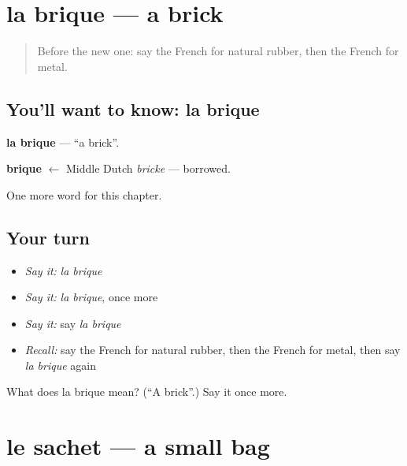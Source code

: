 \section[la brique]{la brique — a brick}

\label{lesson:FR-C202-brique}



\begin{quote}
Before the new one: say the French for natural rubber, then the French for metal.
\end{quote}

\subsection*{You'll want to know: la brique}
\textbf{la brique} — \textquotedblleft{}a brick\textquotedblright{}.

\begin{cousinweb}
\textbf{brique} $\leftarrow$ Middle Dutch \emph{bricke} — borrowed.
\end{cousinweb}

\begin{grammarlens}[title={What you've built}]
One more word for this chapter.
\end{grammarlens}

\subsection*{Your turn}
\begin{itemize}
\raggedright
  \item \emph{Say it:} \emph{la brique}
  \item \emph{Say it:} \emph{la brique}, once more
  \item \emph{Say it:} say \emph{la brique}
  \item \emph{Recall:} say the French for natural rubber, then the French for metal, then say \emph{la brique} again
\end{itemize}

\begin{tcolorbox}[breakable,colback=teal!4,colframe=teal!35!black,title={Before you move on}]
What does la brique mean? (\textquotedblleft{}A brick\textquotedblright{}.) Say it once more.
\end{tcolorbox}
\section[le sachet]{le sachet — a small bag}

